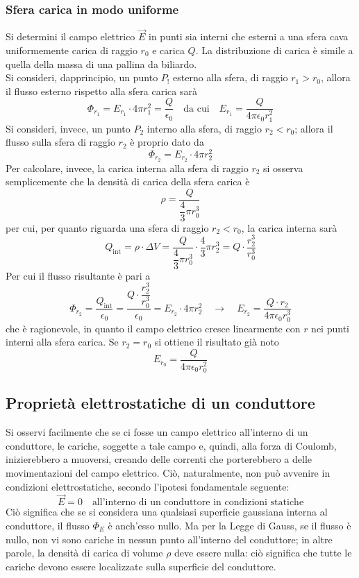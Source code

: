 \documentclass[a4paper]{extarticle}
\begin{document}
\vspace{1em}
\noindent
\subsubsection{Sfera carica in modo uniforme}
Si determini il campo elettrico $\vec E$ in punti sia interni che esterni a una sfera cava uniformemente carica di raggio $r_0$ e carica $Q$. La distribuzione di carica è simile a quella della massa di una pallina da biliardo.\\
Si consideri, dapprincipio, un punto $P_!$ esterno alla sfera, di raggio $r_1 > r_0$, allora il flusso esterno rispetto alla sfera carica sarà
\[\Phi_{r_1} = E_{r_1} \cdot 4 \pi r_1^2 = \frac{Q}{\epsilon_0} \hspace{1em} \text{da cui} \hspace{1em} E_{r_1} = \frac{Q}{4 \pi \epsilon_0 r_1^2}\]
Si consideri, invece, un punto $P_2$ interno alla sfera, di raggio $r_2 < r_0$; allora il flusso sulla sfera di raggio $r_2$ è proprio dato da
\[\Phi_{r_2} = E_{r_2} \cdot 4 \pi r_2^2\]
Per calcolare, invece, la carica interna alla sfera di raggio $r_2$ si osserva semplicemente che la densità di carica della sfera carica è
\[\rho = \dfrac{Q}{\dfrac{4}{3} \pi r_0^3}\]
per cui, per quanto riguarda una sfera di raggio $r_2<r_0$, la carica interna sarà
\[Q_\text{int} = \rho \cdot \Delta V = \dfrac{Q}{\dfrac{4}{3} \pi r_0^3} \cdot \frac{4}{3} \pi r_2^3 = Q \cdot \frac{r_2^3}{r_0^3}\]
Per cui il flusso risultante è pari a
\[\Phi_{r_2} = \frac{Q_\text{int}}{\epsilon_0} = \dfrac{Q \cdot \dfrac{r_2^3}{r_0^3}}{\epsilon_0} = E_{r_2} \cdot 4 \pi r_2^2 \hspace{1em} \rightarrow \hspace{1em} E_{r_2} = \frac{Q \cdot r_2}{4 \pi \epsilon_0 r_0^3}\]
che è ragionevole, in quanto il campo elettrico cresce linearmente con $r$ nei punti interni alla sfera carica. Se $r_2=r_0$ si ottiene il risultato già noto
\[E_{r_0}=\frac{Q}{4 \pi \epsilon_0 r_0^2}\]

\vspace{1em}
\noindent
\subsection{Proprietà elettrostatiche di un conduttore}
Si osservi facilmente che se ci fosse un campo elettrico all'interno di un conduttore, le cariche, soggette a tale campo e, quindi, alla forza di Coulomb, inizierebbero a muoversi, creando delle correnti che porterebbero a delle movimentazioni del campo elettrico. Ciò, naturalmente, non può avvenire in condizioni elettrostatiche, secondo l'ipotesi fondamentale seguente:
\[\boxed{\vec E = 0 \hspace{1em} \text{all'interno di un conduttore in condizioni statiche}}\]
Ciò significa che se si considera una qualsiasi superficie gaussiana interna al conduttore, il flusso $\Phi_E$ è anch'esso nullo. Ma per la Legge di Gauss, se il flusso è nullo, non vi sono cariche in nessun punto all'interno del conduttore; in altre parole, la densità di carica di volume $\rho$ deve essere nulla: ciò significa che tutte le cariche devono essere localizzate sulla superficie del conduttore.
\end{document}
